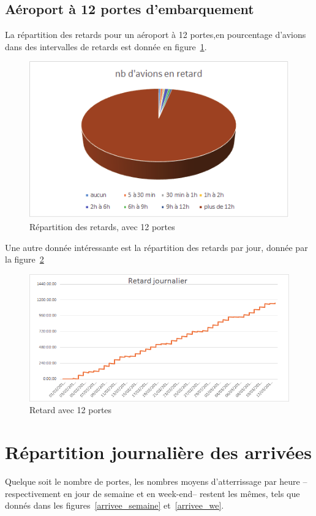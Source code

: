  \subsection{Aéroport à 12 portes d'embarquement}
La répartition des retards pour un aéroport à 12 portes,en pourcentage d'avions dans des intervalles de retards est donnée en figure~\ref{retard_camenbert_12}.
  \graphicspath{{donnees/graph_90jours/12portes/}}
\begin{figure}[H]
\centering \includegraphics[scale=0.6]{retard_avions.png}
 \caption{\label{retard_camenbert_12} Répartition des retards, avec 12 portes} 
\end{figure}
 
 Une autre donnée intéressante est la répartition des retards par jour, donnée par la figure~\ref{retard_jour_12}
\begin{figure}[H]
\centering \includegraphics[scale=0.6]{retard_jour.png}
 \caption{\label{retard_jour_12} Retard avec 12 portes} 
\end{figure}
 
\section{Répartition journalière des arrivées}
Quelque soit le nombre de portes, les nombres moyens d'atterrissage par heure --respectivement en jour de semaine et en week-end-- restent les mêmes, tels que donnés dans les figures~\ref{arrivee_semaine} et~\ref{arrivee_we}.

